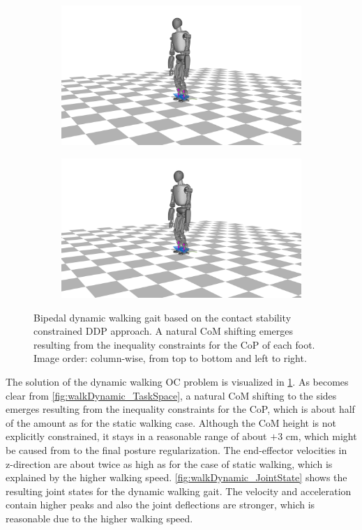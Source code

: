 \begin{figure}[h!]
\begin{subfigure}{.5\textwidth}
	\includegraphics[width=1\linewidth]{fig/walkDynamic/snaps/7}
\end{subfigure}%
\begin{subfigure}{.5\textwidth}
	\includegraphics[width=1\linewidth]{fig/walkDynamic/snaps/8}
\end{subfigure}
\caption[Dynamic walking based on the contact stability constrained \gls{DDP}]{Bipedal dynamic walking gait based on the contact stability constrained \gls{DDP} approach. A natural \gls{CoM} shifting emerges resulting from the inequality constraints for the \gls{CoP} of each foot. Image order: column-wise, from top to bottom and left to right.}
\label{fig:walkDynamic_Snaps}
\end{figure}

The solution of the dynamic walking \gls{OC} problem is visualized in \cref{fig:walkDynamic_Snaps}. As becomes clear from \cref{fig:walkDynamic_TaskSpace}, a natural \gls{CoM} shifting to the sides emerges resulting from the inequality constraints for the \gls{CoP}, which is about half of the amount as for the static walking case. Although the \gls{CoM} height is not explicitly constrained, it stays in a reasonable range of about $+$3 cm, which might be caused from to the final posture regularization. The end-effector velocities in z-direction are about twice as high as for the case of static walking, which is explained by the higher walking speed. 
\cref{fig:walkDynamic_JointState} shows the resulting joint states for the dynamic walking gait. The velocity and acceleration contain higher peaks and also the joint deflections are stronger, which is reasonable due to the higher walking speed.       

